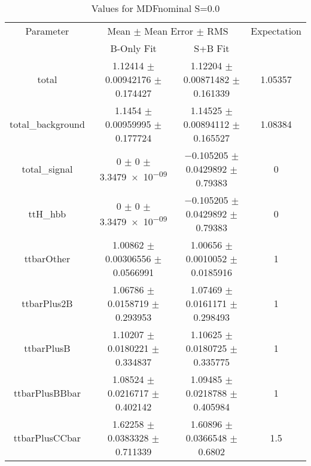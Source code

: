 \begin{table}
\centering
\caption{Values for MDFnominal S=0.0}
\begin{tabular}{cccc}
\toprule
Parameter & \multicolumn{2}{c}{Mean $\pm$ Mean Error $\pm$ RMS} & Expectation\\
 & B-Only Fit & S+B Fit & \\
\midrule
total & \num{1.12414} $\pm$ \num{0.00942176} $\pm$ \num{0.174427} & \num{1.12204} $\pm$ \num{0.00871482} $\pm$ \num{0.161339} & \num{1.05357}\\
total\_background & \num{1.1454} $\pm$ \num{0.00959995} $\pm$ \num{0.177724} & \num{1.14525} $\pm$ \num{0.00894112} $\pm$ \num{0.165527} & \num{1.08384}\\
total\_signal & \num{0} $\pm$ \num{0} $\pm$ \num{3.3479e-09} & \num{-0.105205} $\pm$ \num{0.0429892} $\pm$ \num{0.79383} & \num{0}\\
ttH\_hbb & \num{0} $\pm$ \num{0} $\pm$ \num{3.3479e-09} & \num{-0.105205} $\pm$ \num{0.0429892} $\pm$ \num{0.79383} & \num{0}\\
ttbarOther & \num{1.00862} $\pm$ \num{0.00306556} $\pm$ \num{0.0566991} & \num{1.00656} $\pm$ \num{0.0010052} $\pm$ \num{0.0185916} & \num{1}\\
ttbarPlus2B & \num{1.06786} $\pm$ \num{0.0158719} $\pm$ \num{0.293953} & \num{1.07469} $\pm$ \num{0.0161171} $\pm$ \num{0.298493} & \num{1}\\
ttbarPlusB & \num{1.10207} $\pm$ \num{0.0180221} $\pm$ \num{0.334837} & \num{1.10625} $\pm$ \num{0.0180725} $\pm$ \num{0.335775} & \num{1}\\
ttbarPlusBBbar & \num{1.08524} $\pm$ \num{0.0216717} $\pm$ \num{0.402142} & \num{1.09485} $\pm$ \num{0.0218788} $\pm$ \num{0.405984} & \num{1}\\
ttbarPlusCCbar & \num{1.62258} $\pm$ \num{0.0383328} $\pm$ \num{0.711339} & \num{1.60896} $\pm$ \num{0.0366548} $\pm$ \num{0.6802} & \num{1.5}\\
\bottomrule
\end{tabular}
\end{table}